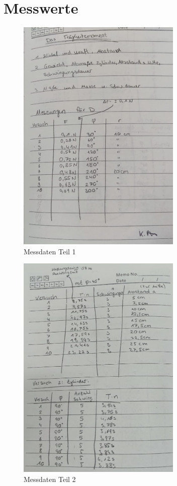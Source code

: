 \section{Messwerte}
\begin{figure}
    \centering
    \includegraphics[width=0.7\textwidth]{index.jpg}
    \caption{Messdaten Teil 1}
    \label{fig:M1}
  \end{figure}

\begin{figure}
    \centering
    \includegraphics[width=0.7\textwidth]{index2.jpg}
    \caption{Messdaten Teil 2}
    \label{fig:M1}
\end{figure}

